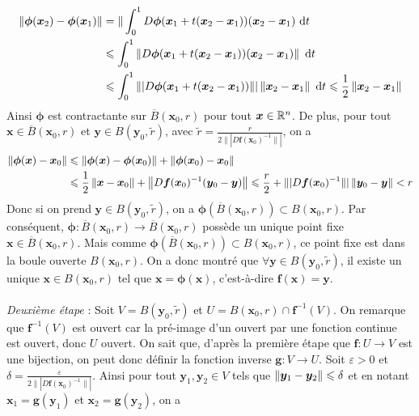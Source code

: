 {	\begin{align*}
		\left\| \bm \phi(\bm x_2) - \bm \phi(\bm x_1) \right\| &= \| \int_0^1 D \bm \phi (\bm x_1 + t(\bm x_2 - \bm x_1)) (\bm x_2 - \bm x_1) ~\mathrm dt \\
		&\leqslant \int_0^1 \left\| D \bm \phi(\bm x_1 + t(\bm x_2 - \bm x_1)) (\bm x_2 - \bm x_1) \right\| ~\mathrm dt \\
		& \leqslant \int_0^1 \|| D \bm \phi(\bm x_1 + t(\bm x_2 - \bm x_1)) \|| \left\| \bm x_2 - \bm x_1 \right\| ~\mathrm dt \leqslant \frac{1}{2} \left\| \bm x_2 - \bm x_1 \right\|
	\end{align*}
	Ainsi $\bm \phi$ est contractante sur $\overline B(\bm x_0, r)$ pour tout $\bm x \in \mathbb R^n$. De plus, pour tout $\bm x \in \overline B(\bm x_0,r)$ et $\bm y \in B(\bm y_0, \tilde r)$, avec $\tilde r = \frac{r}{2 \|| D \bm f(\bm x_0)^{-1}\||}$, on a
	\begin{align*}
		\left\| \bm \phi(\bm x) - \bm  x_0 \right\|   &\leqslant \left\| \bm \phi(\bm x) - \bm \phi(\bm x_0) \right\| + \left\| \bm \phi (\bm x_0) - \bm x_0 \right\| \\
		&\leqslant \frac{1}{2} \left\| \bm x -\bm x_0 \right\| + \left\| D \bm f(\bm x_0)^{-1} (\bm y_0 - \bm y) \right\| \leqslant \frac{r}{2} + \|| D \bm f(\bm x_0)^{-1} \||  \left\| \bm y_0 - \bm y \right\| < r		
	\end{align*}
	Donc si on prend $\bm y \in B(\bm y_0, \tilde r)$, on a $\bm \phi (\overline B(\bm x_0, r)) \subset B(\bm x_0, r)$. Par conséquent, $\bm \phi : \overline B(\bm x_0, r) \to \overline B(\bm x_0, r)$ possède un unique point fixe $\bm x \in \overline B(\bm x_0, r)$. Mais comme $\bm \phi (\overline B(\bm x_0, r)) \subset B(\bm x_0, r)$, ce point fixe est dans la boule ouverte $B(\bm x_0, r)$. On a donc montré que $\forall \bm y \in B(\bm y_0, \tilde r)$, il existe un unique $\bm x \in B(\bm x_0, r)$ tel que $\bm x = \bm \phi(\bm x)$, c'est-à-dire $\bm f(\bm x) = \bm y$. \\ \\
	\textit{Deuxième étape} : Soit $V = B(\bm y_0, \tilde r)$ et $U = B(\bm x_0, r) \cap \bm f^{-1} (V)$. On remarque que $\bm f^{-1} (V)$ est ouvert car la pré-image d'un ouvert par une fonction continue est ouvert, donc $U$ ouvert. On sait que, d'après la première étape que $\bm f: U \to V$ est une bijection, on peut donc définir la fonction inverse $\bm g : V \to U$. Soit $\varepsilon > 0$ et $\delta = \frac{\varepsilon}{2 \|| D \bm f(\bm x_0)^{-1} \||}$. Ainsi pour tout $\bm y_1, \bm y_2 \in V$ tels que $\left\| \bm y_1 - \bm y_2 \right\| \leqslant \delta$ et en notant $\bm x_1 = \bm g(\bm y_1)$ et $\bm x_2 = \bm g(\bm y_2)$, on a
}

